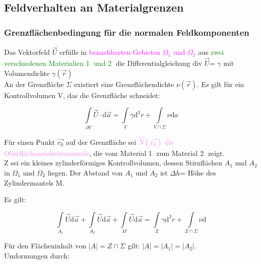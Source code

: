\documentclass[]{article}
\newcommand{\dd}{\ensuremath{\text{d}}}
\begin{document}
\newpage

\subsection{Feldverhalten an Materialgrenzen}
\subsubsection{Grenzflächenbedingung für die normalen Feldkomponenten}
	Das Vektorfeld $\vec{U}$ erfülle in \textcolor{magenta}{benachbarten Gebieten $\Omega_1$ und $\Omega_2$} aus \textcolor{green}{zwei verschiedenen Materialien \textcircled{1} und \textcircled{2}} die Differentialgleichung div $\vec{U}$= $\gamma$ mit Volumendichte $\gamma(\vec{r})$
	\\An der Grenzfläche $\Sigma$ existiert eine Grenzflächendichte $\nu(\vec{r})$. Es gilt für ein Kontrollvolumen V, das die Grenzfläche schneidet: 

	\begin{boxedminipage}[blue]{\textwidth}
		$$\int\limits_{∂V}\vec{U}\cdot \dd \vec{a}=\int\limits_{V}\gamma \dd^3 r + \int\limits_{V\cap \Sigma}\nu \dd a$$
	\end{boxedminipage}
	
	Für einen Punkt $\vec{r_0}$ auf der Grenzfläche sei \textcolor{violet}{$\vec{N}(\vec{r_0})$ die Oberflächeneinheitsnormale}, die vom Material \textcircled{1} zum Material \textcircled{2} zeigt. 
	\\ Z sei ein kleines zylinderförmiges Kontrollvolumen, dessen Stirnflächen $A_1$ und $A_2$ in $\Omega_1$ und $\Omega_2$ liegen. Der Abstand von $A_1$ und $A_2$ ist $\Delta h$= Höhe des Zylindermantels M. 

\newpage

 	Es gilt: 

	\begin{center}
		\begin{boxedminipage}[red]{9cm}
			\begin{displaymath}
				\int\limits_{A_1} \vec{U}\dd \vec{a}+\int\limits_{A_2}\vec{U}\dd \vec{a}+\int\limits_{M}\vec{U}\dd \vec{a}=\int\limits_{Z}\gamma \dd^3 r+\int\limits_{Z \cap \Sigma} \nu \dd 
			\end{displaymath} 
		\end{boxedminipage}
	\end{center}
	
	Für den Flächeninhalt von $|A|=Z\cap \Sigma$ gilt: $|A|=|A_1|=|A_2|$.
	\\Umformungen durch:
	
\end{document}
